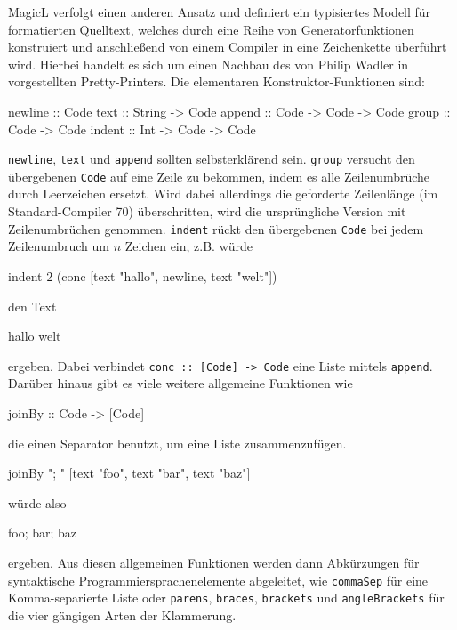 \documentclass[12pt, a4paper, bibgerm]{scrbook}
\newenvironment{DIFnomarkup}{}{}
\newcommand\icode[1]{\lstinline?#1?}
\begin{document}
MagicL verfolgt einen anderen Ansatz und definiert ein typisiertes
Modell für formatierten Quelltext, welches durch eine Reihe von
Generatorfunktionen konstruiert und anschließend von einem Compiler in
eine Zeichenkette überführt wird. Hierbei handelt es sich um einen Nachbau
des von Philip Wadler in \cite[S.223ff]{FunOfProgramming} vorgestellten
Pretty-Printers. Die elementaren Konstruktor-Funktionen sind:
\begin{DIFnomarkup}\begin{code}
newline :: Code
text    :: String -> Code
append  :: Code   -> Code -> Code
group   :: Code   -> Code
indent  :: Int    -> Code -> Code
\end{code}\end{DIFnomarkup}

\icode{newline}, \icode{text} und \icode{append} sollten selbsterklärend
sein. \icode{group} versucht den übergebenen \icode{Code} auf eine Zeile
zu bekommen, indem es alle Zeilenumbrüche durch Leerzeichen
ersetzt. Wird dabei allerdings die geforderte Zeilenlänge (im
Standard-Compiler 70) überschritten, wird die ursprüngliche Version mit
Zeilenumbrüchen genommen. \icode{indent} rückt den übergebenen
\icode{Code} bei jedem Zeilenumbruch um $n$ Zeichen ein, z.B. würde
\begin{DIFnomarkup}\begin{code}
indent 2 (conc [text "hallo", newline, text "welt"])
\end{code}\end{DIFnomarkup}
den Text
\begin{DIFnomarkup}\begin{code}
hallo
  welt
\end{code}\end{DIFnomarkup}
ergeben. Dabei verbindet \icode{conc :: [Code] -> Code} eine Liste
mittels \icode{append}. Darüber hinaus gibt es viele weitere allgemeine
Funktionen wie
\begin{DIFnomarkup}\begin{code}
  joinBy :: Code -> [Code]
\end{code}\end{DIFnomarkup}
die einen Separator benutzt, um eine Liste zusammenzufügen.
\begin{DIFnomarkup}\begin{code}
joinBy "; " [text "foo", text "bar", text "baz"]
\end{code}\end{DIFnomarkup}
würde also
\begin{DIFnomarkup}\begin{code}
foo; bar; baz
\end{code}\end{DIFnomarkup}
ergeben. Aus diesen allgemeinen Funktionen werden dann Abkürzungen für
syntaktische Programmiersprachenelemente abgeleitet, wie
\icode{commaSep} für eine Komma-separierte Liste oder \icode{parens},
\icode{braces}, \icode{brackets} und \icode{angleBrackets} für die vier
gängigen Arten der Klammerung.
\end{document}

